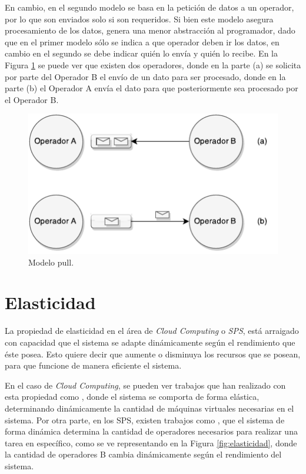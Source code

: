 En cambio, en el segundo modelo se basa en la petición de datos a un operador, por lo que son enviados solo si son requeridos. Si bien este modelo asegura procesamiento de los datos, genera una menor abstracción al programador, dado que en el primer modelo sólo se indica a que operador deben ir los datos, en cambio en el segundo se debe indicar quién lo envía y quién lo recibe. En la Figura \ref{fig:sps-pull} se puede ver que existen dos operadores, donde en la parte (a) se solicita por parte del Operador B el envío de un dato para ser procesado, donde en la parte (b) el Operador A envía el dato para que posteriormente sea procesado por el Operador B.

\begin{figure}[ht!]
  \centering
    \includegraphics[scale=1]{images/SPS-Pull.pdf}
  \caption{Modelo pull.}
  \label{fig:sps-pull}
\end{figure}

\section{Elasticidad}
\label{sec:elasticidad}

La propiedad de elasticidad en el área de \textit{Cloud Computing} o \textit{SPS}, está arraigado con capacidad que el sistema se adapte dinámicamente según el rendimiento que éste posea. Esto quiere decir que aumente o disminuya los recursos que se posean, para que funcione de manera eficiente el sistema.

En el caso de \textit{Cloud Computing}, se pueden ver trabajos que han realizado con esta propiedad como \citep{GongGW10, NguyenSGSW13, LehrigEB15}, donde el sistema se comporta de forma elástica, determinando dinámicamente la cantidad de máquinas virtuales necesarias en el sistema. Por otra parte, en los SPS, existen trabajos como \citep{GedikSHW14, IshiiS11, SchneiderAGBW09, MadsenTZ14, GulisanoJPSV12}, que el sistema de forma dinámica determina la cantidad de operadores necesarios para realizar una tarea en específico, como se ve representando en la Figura \ref{fig:elasticidad}, donde la cantidad de operadores B cambia dinámicamente según el rendimiento del sistema.

